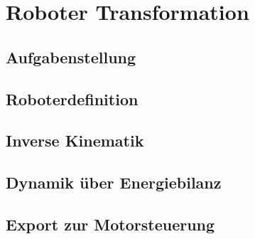 \documentclass[12pt, oneside, a4paper]{scrreprt}
\begin{document}
%
%
%
%
%

\newpage
\setcounter{page}{1}

\chapter{Roboter Transformation}

\section{Aufgabenstellung}


\section{Roboterdefinition}


\section{Inverse Kinematik}


\section{Dynamik über Energiebilanz}

\label{Dynamik}

\section{Export zur Motorsteuerung}



\printbibliography
\end{document}
